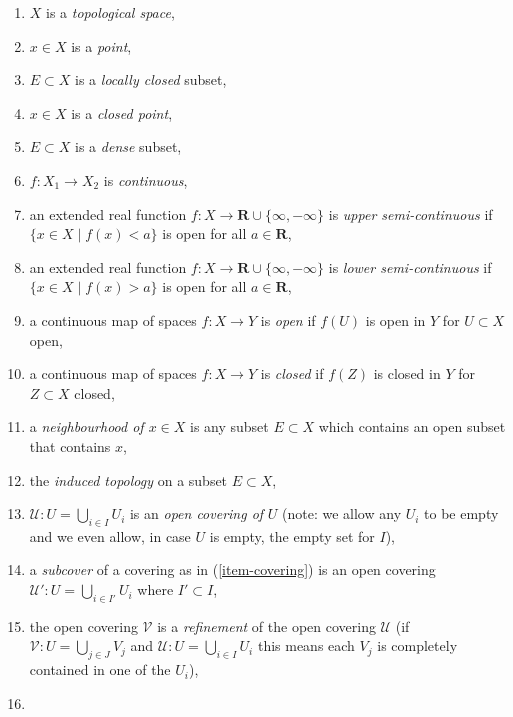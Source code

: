 \begin{enumerate}
\item
\label{item-space}
$X$ is a {\it topological space},
\item
\label{item-point}
$x\in X$ is a {\it point},
\item
\label{item-locally-closed}
$E \subset X$ is a {\it locally closed} subset,
\item
\label{item-closed-point}
$x\in X$ is a {\it closed point},
\item
\label{item-dense}
$E \subset X$ is a {\it dense} subset,
\item
\label{item-continuous}
$f : X_1 \to X_2$ is {\it continuous},
\item
\label{item-upper-semi-continuous}
an extended real function $f : X \to \mathbf{R} \cup \{\infty, -\infty\}$
is {\it upper semi-continuous} if $\{x \in X \mid f(x) < a\}$ is open for
all $a \in \mathbf{R}$,
\item
\label{item-lower-semi-continuous}
an extended real function $f : X \to \mathbf{R} \cup \{\infty, -\infty\}$
is {\it lower semi-continuous} if $\{x \in X \mid f(x) > a\}$ is open for
all $a \in \mathbf{R}$,
\item a continuous map of spaces $f : X \to Y$ is
{\it open} if $f(U)$ is open in $Y$ for $U \subset X$ open,
\item a continuous map of spaces $f : X \to Y$ is
{\it closed} if $f(Z)$ is closed in $Y$ for $Z \subset X$ closed,
\item
\label{item-neighbourhood}
a {\it neighbourhood of $x \in X$} is any subset
$E \subset X$ which contains an open subset that
contains $x$,
\item
\label{item-induced-topology}
the {\it induced topology} on a subset $E \subset X$,
\item
\label{item-covering}
$\mathcal{U} : U = \bigcup_{i \in I} U_i$ is an
{\it open covering of} $U$ (note: we allow any $U_i$ to be empty
and we even allow, in case $U$ is empty, the empty set for $I$),
\item
\label{item-subcover}
a {\it subcover} of a covering as in (\ref{item-covering})
is an open covering $\mathcal{U}' : U = \bigcup_{i \in I'} U_i$
where $I' \subset I$,
\item
\label{item-refinement}
the open covering $\mathcal{V}$ is a {\it refinement}
of the open covering $\mathcal{U}$ (if
$\mathcal{V} : U = \bigcup_{j \in J} V_j$ and
$\mathcal{U} : U = \bigcup_{i \in I} U_i$
this means each $V_j$ is completely contained in one of the $U_i$),
\item

\end{enumerate}
